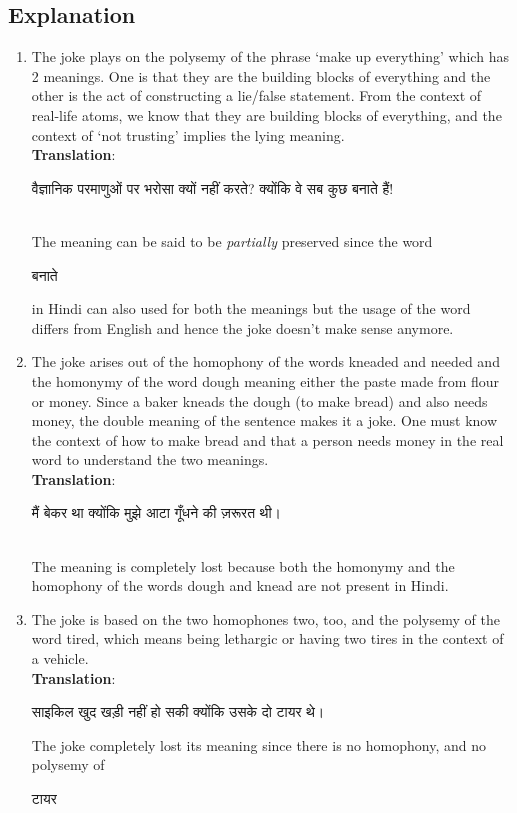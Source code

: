 \documentclass{article}
\begin{document}
\subsection{Explanation}
\begin{enumerate}
    \item The joke plays on the polysemy of the phrase `make up everything' which has 2 meanings. One is that they are the building blocks of everything and the other is the act of constructing a lie/false statement. From the context of real-life atoms, we know that they are building blocks of everything, and the context of `not trusting' implies the lying meaning.
    \medskip\\
    \textbf{Translation}: \begin{hindi}{वैज्ञानिक परमाणुओं पर भरोसा क्यों नहीं करते? क्योंकि वे सब कुछ बनाते हैं!}\end{hindi} \\
    The meaning can be said to be \textit{partially} preserved since the word \begin{hindi}बनाते\end{hindi} in Hindi can also used for both the meanings but the usage of the word differs from English and hence the joke doesn't make sense anymore.

    \item The joke arises out of the homophony of the words kneaded and needed and the homonymy of the word dough meaning either the paste made from flour or money.
    Since a baker kneads the dough (to make bread) and also needs money, the double meaning of the sentence makes it a joke.
    One must know the context of how to make bread and that a person needs money in the real word to understand the two meanings. 
    \medskip\\
    \textbf{Translation}: \begin{hindi}
        मैं बेकर था क्योंकि मुझे आटा गूँधने की ज़रूरत थी।
    \end{hindi}\\
    The meaning is completely lost because both the homonymy and the homophony of the words dough and knead are not present in Hindi.

    \item The joke is based on the two homophones two, too, and the polysemy of the word tired, which means being lethargic or having two tires in the context of a vehicle.\medskip\\
    \textbf{Translation}: \begin{hindi}साइकिल खुद खड़ी नहीं हो सकी क्योंकि उसके दो टायर थे।\end{hindi}
    The joke completely lost its meaning since there is no homophony, and no polysemy of \begin{hindi}टायर\end{hindi}


\end{enumerate}
\end{document}
